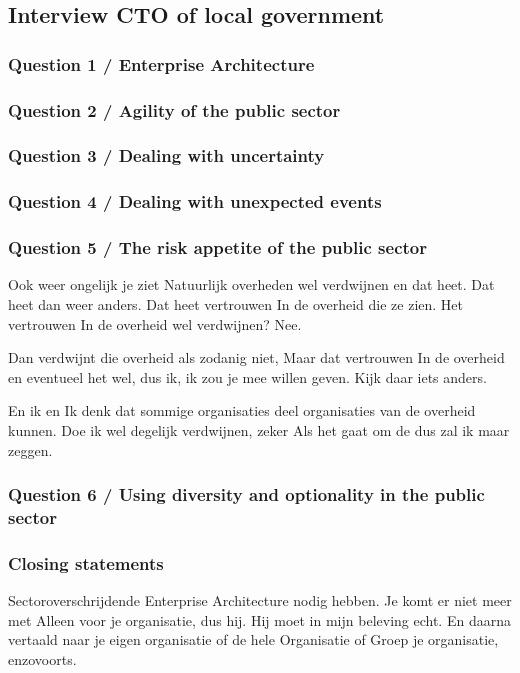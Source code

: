 \subsection{Interview CTO of local government}
\label{sub:interviewctolocal}

\subsubsection{Question 1 / Enterprise Architecture}

\subsubsection{Question 2 / Agility of the public sector}

\subsubsection{Question 3 / Dealing with uncertainty}

\subsubsection{Question 4 / Dealing with unexpected events}

\subsubsection{Question 5 / The risk appetite of the public sector}


Ook weer ongelijk je ziet Natuurlijk overheden wel verdwijnen en dat heet. Dat heet dan weer anders. Dat heet vertrouwen In de overheid die ze zien. Het vertrouwen In de overheid wel verdwijnen? Nee.

Dan verdwijnt die overheid als zodanig niet, Maar dat vertrouwen In de overheid en eventueel het wel, dus ik, ik zou je mee willen geven. Kijk daar iets anders.

En ik en Ik denk dat sommige organisaties deel organisaties van de overheid kunnen. Doe ik wel degelijk verdwijnen, zeker Als het gaat om de dus zal ik maar zeggen.

\subsubsection{Question 6 / Using diversity and optionality in the public sector}

\subsubsection{Closing statements}

Sectoroverschrijdende Enterprise Architecture nodig hebben.
Je komt er niet meer met Alleen voor je organisatie, dus hij. Hij moet in mijn beleving echt.
En daarna vertaald naar je eigen organisatie of de hele Organisatie of Groep je organisatie, enzovoorts.
